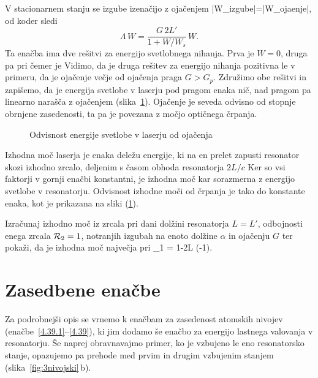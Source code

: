 V stacionarnem stanju se izgube izenačijo z ojačenjem
\beq
|\Delta W_{\rm izgube}|=|\Delta W_{\rm ojaenje}|,
\eeq
od koder sledi
\begin{equation}  
\Lambda\, W=\frac{G\,2L'}{1+W/W_s}\,W.
\label{5.3}
\end{equation}
Ta enačba ima dve rešitvi za energijo svetlobnega nihanja. 
Prva je $W=0$, druga pa  
pri čemer je 
Vidimo, da je druga rešitev za energijo nihanja pozitivna le v primeru,
da je ojačenje večje od ojačenja praga $G> G_p$. Združimo 
obe rešitvi in zapišemo, da je energija svetlobe v laserju pod pragom enaka
nič, nad pragom pa linearno narašča z ojačenjem (slika~\ref{fig:energija}).
Ojačenje je seveda odvisno od stopnje obrnjene zasedenosti, ta pa je povezana
z močjo optičnega črpanja.
\begin{figure}[h]
\centering
\def\svgwidth{80truemm} 

\caption{Odvisnost energije svetlobe v laserju od ojačenja}
\label{fig:energija}
\end{figure}

Izhodna moč laserja je enaka deležu energije, ki na en prelet zapusti
resonator skozi izhodno zrcalo, deljenim s časom obhoda resonatorja $2L/c$ 
Ker so vsi faktorji v gornji enačbi konstantni, je izhodna moč kar sorazmerna
z energijo svetlobe v resonatorju. Odvisnost izhodne moči od črpanja je 
tako do konstante enaka, kot je prikazana na sliki (\ref{fig:energija}). 

\begin{definition}
Izračunaj izhodno moč iz zrcala pri dani dolžini resonatorja $L=L'$, 
odbojnosti enega zrcala ${\cal {R}}_{2}=1$, 
notranjih izgubah na enoto dolžine $\alpha$ in ojačenju $G$ ter pokaži, da
je izhodna moč največja pri 
\beq
{}_1 = 1-2\alpha L \left(-1\right).
\eeq
\end{definition}

\section{Zasedbene enačbe}
Za podrobnejši opis se vrnemo k enačbam za zasedenost atomskih nivojev 
(enačbe~\ref{4.39.1}--\ref{4.39}), ki jim dodamo še enačbo za energijo 
lastnega valovanja v resonatorju. Še naprej obravnavajmo primer, ko je 
vzbujeno le eno resonatorsko stanje, opazujemo pa prehode med prvim 
in drugim vzbujenim stanjem (slika~\ref{fig:3nivojski}\,b). 


